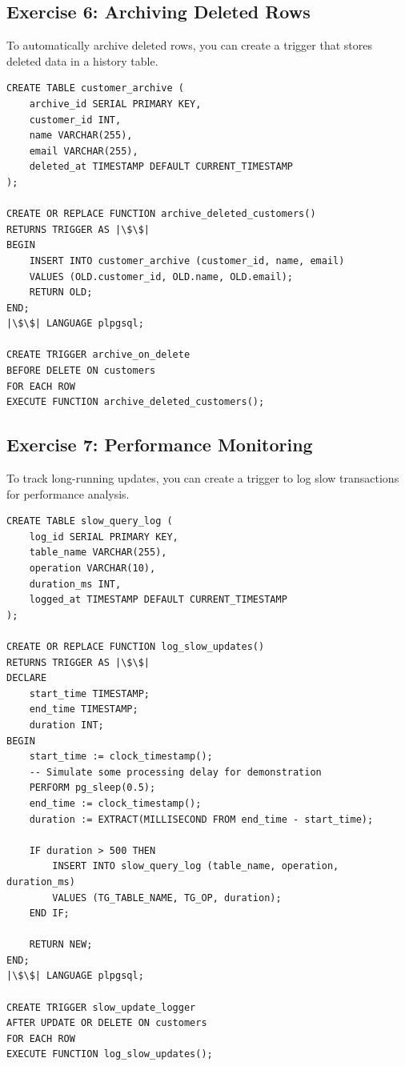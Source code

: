 \documentclass{article}
\begin{document}
\subsection*{Exercise 6: Archiving Deleted Rows}
To automatically archive deleted rows, you can create a trigger that stores deleted data in a history table.

\begin{verbatim}
CREATE TABLE customer_archive (
    archive_id SERIAL PRIMARY KEY,
    customer_id INT,
    name VARCHAR(255),
    email VARCHAR(255),
    deleted_at TIMESTAMP DEFAULT CURRENT_TIMESTAMP
);

CREATE OR REPLACE FUNCTION archive_deleted_customers()
RETURNS TRIGGER AS |\$\$|
BEGIN
    INSERT INTO customer_archive (customer_id, name, email)
    VALUES (OLD.customer_id, OLD.name, OLD.email);
    RETURN OLD;
END;
|\$\$| LANGUAGE plpgsql;

CREATE TRIGGER archive_on_delete
BEFORE DELETE ON customers
FOR EACH ROW
EXECUTE FUNCTION archive_deleted_customers();
\end{verbatim}

\subsection*{Exercise 7: Performance Monitoring}
To track long-running updates, you can create a trigger to log slow transactions for performance analysis.

\begin{verbatim}
CREATE TABLE slow_query_log (
    log_id SERIAL PRIMARY KEY,
    table_name VARCHAR(255),
    operation VARCHAR(10),
    duration_ms INT,
    logged_at TIMESTAMP DEFAULT CURRENT_TIMESTAMP
);

CREATE OR REPLACE FUNCTION log_slow_updates()
RETURNS TRIGGER AS |\$\$|
DECLARE
    start_time TIMESTAMP;
    end_time TIMESTAMP;
    duration INT;
BEGIN
    start_time := clock_timestamp();
    -- Simulate some processing delay for demonstration
    PERFORM pg_sleep(0.5);
    end_time := clock_timestamp();
    duration := EXTRACT(MILLISECOND FROM end_time - start_time);

    IF duration > 500 THEN
        INSERT INTO slow_query_log (table_name, operation, duration_ms)
        VALUES (TG_TABLE_NAME, TG_OP, duration);
    END IF;

    RETURN NEW;
END;
|\$\$| LANGUAGE plpgsql;

CREATE TRIGGER slow_update_logger
AFTER UPDATE OR DELETE ON customers
FOR EACH ROW
EXECUTE FUNCTION log_slow_updates();
\end{verbatim}



\end{document}

